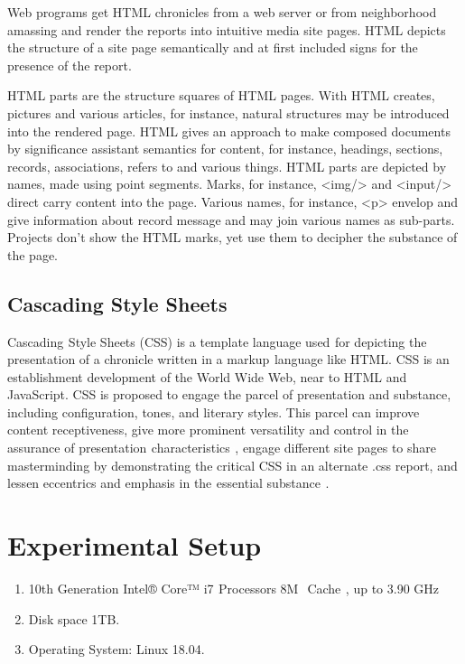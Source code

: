\documentclass[oneside,12pt]{Classes/VTU}
\begin{document}
	Web programs get HTML chronicles from a web server or from neighborhood amassing and render the reports into intuitive media site pages. HTML depicts the structure of a site page semantically and at first included signs for the presence of the report.
	
	HTML parts are the structure squares of HTML pages. With HTML creates, pictures and various articles, for instance, natural structures may be introduced into the rendered page. HTML gives an approach to make composed documents by significance assistant semantics for content, for instance, headings, sections, records, associations, refers to and various things. HTML parts are depicted by names, made using point segments. Marks, for instance, <img/> and <input/> direct carry content into the page. Various names, for instance, <p> envelop and give information about record message and may join various names as sub-parts. Projects don't show the HTML marks, yet use them to decipher the substance of the page.
	
	\subsection{Cascading Style Sheets}
	Cascading\tiny\textcolor{white}{s}\normalsize Style Sheets (CSS) is a template language used\tiny\textcolor{white}{s}\normalsize for depicting the presentation of a chronicle written in a markup\tiny\textcolor{white}{s}\normalsize language like HTML. CSS is an establishment development of the World Wide Web, near to HTML and JavaScript. CSS is proposed to engage the parcel of presentation and substance, including configuration, tones, and literary styles. This parcel can improve content receptiveness, give more prominent versatility and control in the assurance of presentation\tiny\textcolor{white}{s}\normalsize characteristics\tiny\textcolor{white}{s}\normalsize , engage different site pages to share masterminding by demonstrating the critical CSS in an alternate .css report, and lessen eccentrics and emphasis in the\tiny\textcolor{white}{s}\normalsize essential substance\tiny\textcolor{white}{s}\normalsize .
	
	\section{Experimental Setup}
	\begin{enumerate}
		\item 10th Generation Intel® Core™ i7\tiny\textcolor{white}{s}\normalsize Processors 8M\tiny\textcolor{white}{B}\normalsize Cache\tiny\textcolor{white}{s}\normalsize , up to 3.90 GHz
		\item Disk space 1TB.
		\item Operating System: Linux 18.04. 
	\end{enumerate}
	
\end{document}
